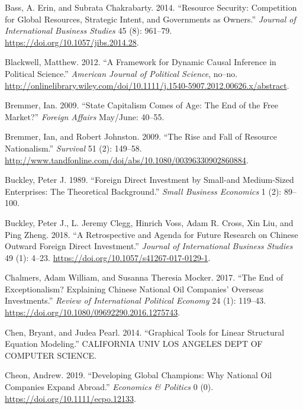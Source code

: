 \documentclass[11pt,]{book}
\begin{document}
\leavevmode\hypertarget{ref-bass_resource_2014}{}%
Bass, A. Erin, and Subrata Chakrabarty. 2014. ``Resource Security: Competition for Global Resources, Strategic Intent, and Governments as Owners.'' \emph{Journal of International Business Studies} 45 (8): 961--79. \url{https://doi.org/10.1057/jibs.2014.28}.

\leavevmode\hypertarget{ref-blackwell_framework_2012}{}%
Blackwell, Matthew. 2012. ``A Framework for Dynamic Causal Inference in Political Science.'' \emph{American Journal of Political Science}, no--no. \url{http://onlinelibrary.wiley.com/doi/10.1111/j.1540-5907.2012.00626.x/abstract}.

\leavevmode\hypertarget{ref-bremmer_state_2009}{}%
Bremmer, Ian. 2009. ``State Capitalism Comes of Age: The End of the Free Market?'' \emph{Foreign Affairs} May/June: 40--55.

\leavevmode\hypertarget{ref-bremmer_rise_2009}{}%
Bremmer, Ian, and Robert Johnston. 2009. ``The Rise and Fall of Resource Nationalism.'' \emph{Survival} 51 (2): 149--58. \url{http://www.tandfonline.com/doi/abs/10.1080/00396330902860884}.

\leavevmode\hypertarget{ref-buckley_foreign_1989}{}%
Buckley, Peter J. 1989. ``Foreign Direct Investment by Small-and Medium-Sized Enterprises: The Theoretical Background.'' \emph{Small Business Economics} 1 (2): 89--100.

\leavevmode\hypertarget{ref-buckley_retrospective_2018}{}%
Buckley, Peter J., L. Jeremy Clegg, Hinrich Voss, Adam R. Cross, Xin Liu, and Ping Zheng. 2018. ``A Retrospective and Agenda for Future Research on Chinese Outward Foreign Direct Investment.'' \emph{Journal of International Business Studies} 49 (1): 4--23. \url{https://doi.org/10.1057/s41267-017-0129-1}.

\leavevmode\hypertarget{ref-chalmers_end_2017}{}%
Chalmers, Adam William, and Susanna Theresia Mocker. 2017. ``The End of Exceptionalism? Explaining Chinese National Oil Companies' Overseas Investments.'' \emph{Review of International Political Economy} 24 (1): 119--43. \url{https://doi.org/10.1080/09692290.2016.1275743}.

\leavevmode\hypertarget{ref-chen_graphical_2014}{}%
Chen, Bryant, and Judea Pearl. 2014. ``Graphical Tools for Linear Structural Equation Modeling.'' CALIFORNIA UNIV LOS ANGELES DEPT OF COMPUTER SCIENCE.

\leavevmode\hypertarget{ref-cheon_developing_2019}{}%
Cheon, Andrew. 2019. ``Developing Global Champions: Why National Oil Companies Expand Abroad.'' \emph{Economics \& Politics} 0 (0). \url{https://doi.org/10.1111/ecpo.12133}.
\end{document}
